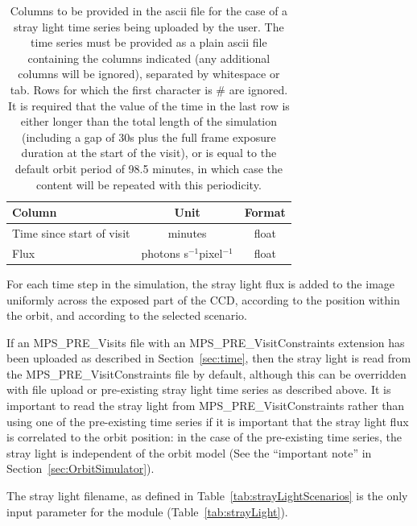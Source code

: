 \documentclass[11pt]{article}      %
\def\HCode#1{}
\def\htmlanchor#1{\HCode{<a id="#1"></a>}}
\begin{document}
\begin{table}[hb]
  \begin{center}
  \caption{Columns to be provided in the ascii file for the case of a stray light time series being uploaded by the user. The time series must be provided as a plain ascii file containing the columns indicated (any additional columns will be ignored), separated by whitespace or tab. Rows for which the first character is \# are ignored. It is required that the value of the time in the last row is either longer than the total length of the simulation (including a gap of 30s plus the full frame exposure duration at the start of the visit), or is equal to the default orbit period of 98.5 minutes, in which case the content will be repeated with this periodicity.}
  \begin{tabular}{| l | c | c |}
    \hline
Column & Unit & Format \\
    \hline
Time since start of visit & minutes & float \\
Flux & photons s$^{-1}$pixel$^{-1}$ & float \\
    \hline
  \end{tabular}
  \label{tab:strayLightUploadFormat}
\end{center}
\end{table}

For each time step in the simulation, the stray light flux is added to the image uniformly across the exposed part of the CCD, according to the position within the orbit, and according to the selected scenario.

\htmlanchor{strayLightFromVisitConstraints}
If an MPS\_PRE\_Visits file with an MPS\_PRE\_VisitConstraints extension has been uploaded as described in Section~\ref{sec:time}, then the stray light is read from the MPS\_PRE\_VisitConstraints file by default, although this can be overridden with file upload or pre-existing stray light time series as described above. It is important to read the stray light from MPS\_PRE\_VisitConstraints rather than using one of the pre-existing time series if it is important that the stray light flux is correlated to the orbit position: in the case of the pre-existing time series, the stray light is independent of the orbit model (See the ``important note'' in Section~\ref{sec:OrbitSimulator}).

The stray light filename, as defined in Table~\ref{tab:strayLightScenarios} is the only input parameter for the module (Table~\ref{tab:strayLight}).
\end{document}
